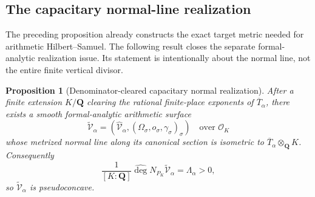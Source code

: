 \documentclass[11pt]{article}
\newtheorem{proposition}[proposition]{Proposition}
\theoremstyle{definition}
\theoremstyle{remark}
\newcommand{\Q}{\mathbf Q}
\newcommand{\widehatdeg}{\widehat{\deg}}
\newcommand{\LambdaAH}{\Lambda}
\begin{document}
\subsection{The capacitary normal-line realization}

The preceding proposition already constructs the exact target metric needed
for arithmetic Hilbert--Samuel.  The following result closes the separate
formal-analytic realization issue.  Its statement is intentionally about the
normal line, not the entire finite vertical divisor.

\begin{proposition}[Denominator-cleared capacitary normal realization]
\label{prop:cap-normal-realization}
After a finite extension $K/\Q$ clearing the rational finite-place exponents
of $\overline T_\alpha$, there exists a smooth formal-analytic arithmetic
surface
\[
 \widetilde{\mathscr V}_\alpha
 =\left(\widehat{\mathscr V}_\alpha,
       (\Omega_\sigma,o_\sigma,\gamma_\sigma)_\sigma\right)
 \quad\text{over }\mathcal O_K
\]
whose metrized normal line along its canonical section is isometric to
$\overline T_\alpha\otimes_\Q K$.  Consequently
\begin{equation}\label{eq:normal-realization-degree}
 \frac1{[K:\Q]}
 \widehatdeg N_{P_K}\widetilde{\mathscr V}_\alpha
 =\LambdaAH_\alpha>0,
\end{equation}
so $\widetilde{\mathscr V}_\alpha$ is pseudoconcave.
\end{proposition}
\end{document}
